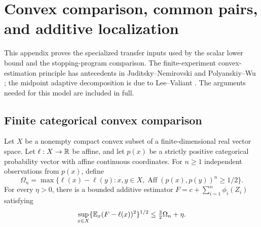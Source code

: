 \section{Convex comparison, common pairs, and additive localization}
\label{sec:transfer-foundations}

This appendix proves the specialized transfer inputs used by the scalar
lower bound and the stopping-program comparison. The finite-experiment
convex-estimation principle has antecedents in
Juditsky--Nemirovski and Polyanskiy--Wu \cite{jn,pw};
the midpoint adaptive decomposition is due to Lee--Valiant \cite{leevaliant}.
The arguments needed for this model are included in full.

\subsection{Finite categorical convex comparison}

\begin{lemma}
\label{lem:finite-comparison}
Let $X$ be a nonempty compact convex subset of a finite-dimensional real vector
space. Let $\ell:X\to\mathbb R$ be affine, and let $p(x)$ be a strictly positive
categorical probability vector with affine continuous coordinates. For $n\ge1$
independent observations from $p(x)$, define
\[
 \Omega_n=\max\{\ell(x)-\ell(y):x,y\in X,
                  \operatorname{Aff}(p(x),p(y))^n\ge1/2\}.
\]
For every $\eta>0$, there is a bounded additive estimator
$F=c+\sum_{i=1}^n\phi_i(Z_i)$ satisfying
\begin{equation}
 \sup_{x\in X}\{\mathbb E_x(F-\ell(x))^2\}^{1/2}
 \le\tfrac32\Omega_n+\eta.
 \label{eq:finite-comparison}
\end{equation}
\end{lemma}

